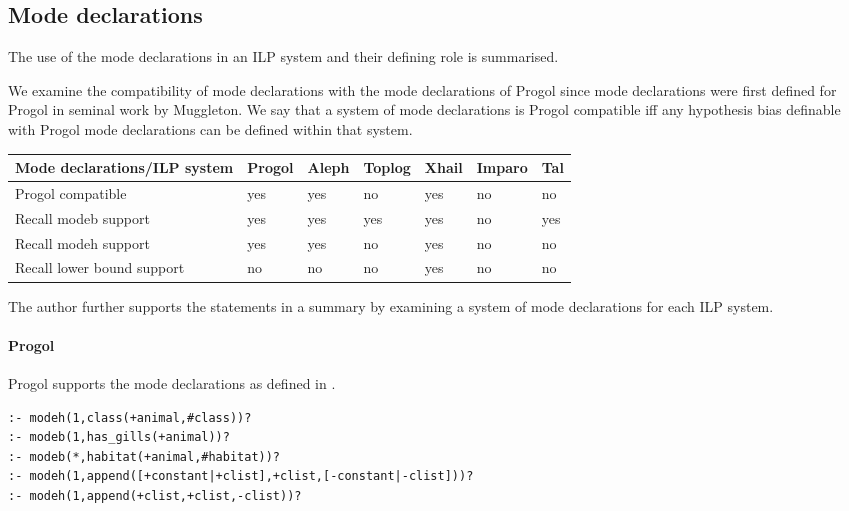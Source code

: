 \subsection{Mode declarations}\label{classification_mode_declarations}
The use of the mode declarations in an ILP system and their defining role is summarised.

We examine the compatibility of mode declarations with the mode declarations of Progol since mode declarations were first defined for Progol in seminal work by Muggleton\cite{muggleton1995inverse}.
We say that a system of mode declarations is Progol compatible iff any hypothesis bias definable with Progol mode declarations can be defined within that system.

 \label{tab:classification_by_mode_declaration_bias} 
 \begin{tabular}{| l | l | l | l | l | l | l |}
    \hline
    Mode declarations/ILP system & Progol & Aleph & Toplog & Xhail & Imparo & Tal \\ \hline
    Progol compatible & yes & yes & no &  yes & no & no \\ \hline
    Recall modeb support & yes & yes & yes & yes & no & yes \\ \hline
    Recall modeh support & yes & yes & no & yes & no & no \\ \hline
    Recall lower bound support & no & no & no & yes & no & no \\ \hline
  \end{tabular}

The author further supports the statements in a summary by examining a system of mode declarations for each ILP system.

\paragraph{Progol}
Progol supports the mode declarations as defined in .

\begin{exmp}\cite{muggleton1999progolWebsite}
\begin{lstlisting}
:- modeh(1,class(+animal,#class))?
:- modeb(1,has_gills(+animal))?
:- modeb(*,habitat(+animal,#habitat))?
:- modeh(1,append([+constant|+clist],+clist,[-constant|-clist]))?
:- modeh(1,append(+clist,+clist,-clist))?
\end{lstlisting}
\end{exmp}

